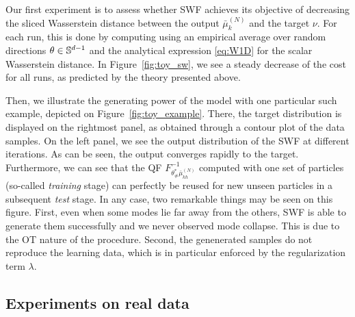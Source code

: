


Our first experiment is to assess whether SWF achieves its objective of decreasing the sliced Wasserstein distance between the output $\bar{\mu}_{k}^{(N)}$ and the target $\nu$. For each run, this is done by computing \label{eqn:sw} using an empirical average over random directions $\theta\in\mathbb{S}^{d-1}$ and the analytical expression \eqref{eq:W1D} for the scalar Wasserstein distance. In Figure~\ref{fig:toy_sw}, we see a steady decrease of the cost for all runs, as predicted by the theory presented above.

Then, we illustrate the generating power of the model with one particular such example, depicted on Figure~\ref{fig:toy_example}. There, the target distribution is displayed on the rightmost panel, as obtained through a contour plot of the data samples. On the left panel, we see the output distribution of the SWF at different iterations. As can be seen, the output converges rapidly to the target. Furthermore, we can see that the QF $F^{-1}_{\theta^*_\#\bar{\mu}_{kh}^{(N)}}$ computed with one set of particles (so-called \textit{training} stage) can perfectly be reused for new unseen particles in a subsequent \textit{test} stage. In any case, two remarkable things may be seen on this figure. First, even when some modes lie far away from the others, SWF is able to generate them successfully and we never observed mode collapse. This is due to the OT nature of the procedure. Second, the genenerated samples do not reproduce the learning data, which is in particular enforced by the regularization term $\lambda$.

\subsection{Experiments on real data}
\label{sub:real_data}

